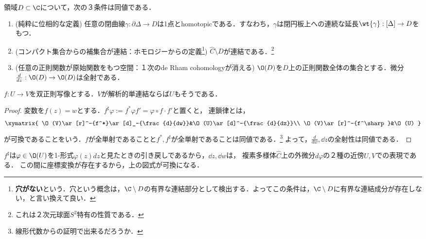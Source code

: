 \documentclass[uplatex, dvipdfmx]{jsreport}
\begin{document}
\begin{proposition}[単連結性の特徴付け]\label{prop-characterization-of-simply-connectedness}
    領域$D\subset\C$について，次の３条件は同値である．
    \begin{enumerate}
        \item (純粋に位相的な定義) 任意の閉曲線$\gamma:\partial\Delta\to D$は1点とhomotopicである．すなわち，$\gamma$は閉円板上への連続な延長$\wt{\gamma}:[\Delta]\to D$をもつ．
        \item (コンパクト集合からの補集合が連結：ホモロジーからの定義\footnote{\textbf{穴がない}という．穴という概念は，$\C\setminus D$の有界な連結部分として検出する．よってこの条件は，$\C\setminus D$に有界な連結成分が存在しない，と言い換えて良い．}) $\hat{C}\setminus D$が連結である．\footnote{これは２次元球面$S^2$特有の性質である．}
        \item (任意の正則関数が原始関数をもつ空間：１次のde Rham cohomologyが消える) $\O(D)$を$D$上の正則関数全体の集合とする．微分$\frac{d}{dz}:\O(D)\to\O(D)$は全射である．
    \end{enumerate}
\end{proposition}

\begin{lemma}[解析的単連結性は双正則写像によって保たれる]
    $f:U\to V$を双正則写像とする．$V$が解析的単連結ならば$U$もそうである．
\end{lemma}
\begin{proof}
    変数を$f(z)=w$とする．$f^\sharp\varphi:=f^*\varphi f'=\varphi\circ f\cdot f'$と置くと，
    連鎖律とは，
    \[\xymatrix{
        \O(V)\ar[r]^-{f^*}\ar[d]_-{\frac{d}{dw}}&\O(U)\ar[d]^-{\frac{d}{dz}}\\
        \O(V)\ar[r]^-{f^\sharp}&\O(U)
    }\]
    が可換であることをいう．$f$が全単射であることと$f^*,f^\sharp$が全単射であることは同値である．\footnote{線形代数からの証明で出来るだろうか．}
    よって，$\frac{d}{dw},\dd{}{z}$の全射性は同値である．
\end{proof}
\begin{remarks}
    $f^\sharp$は$\varphi\in\O(U)$を1-形式$\varphi(z)dz$と見たときの引き戻しであるから，$\dd{}{z},\dd{}{w}$は，
    複素多様体$\hat{C}$上の外微分$d\varphi$の２種の近傍$U,V$での表現である．
    この間に座標変換が存在するから，上の図式が可換になる．
\end{remarks}
\end{document}
